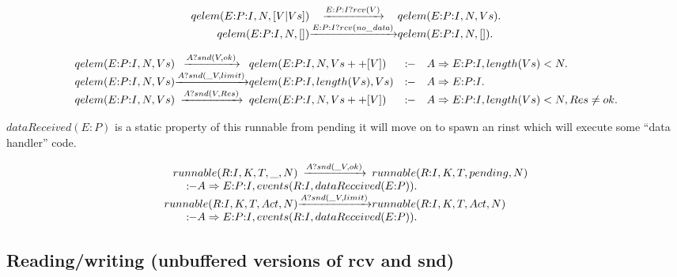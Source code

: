 \newcommand{\nodata}{\ensuremath{\mathit{no\_data}}}
\[
\begin{array}{r@{}c@{}l}
  \Preduce{qelem(E{:}P{:}I, N, [V|Vs])}{\Phear{E{:}P{:}I}{rcv(V)}}      {qelem(E{:}P{:}I, N, Vs)}    .
\\\Preduce{qelem(E{:}P{:}I, N, [])}    {\Phear{E{:}P{:}I}{rcv(\nodata)}}{qelem(E{:}P{:}I, N, [])}    .
\end{array}
\]


\[
\begin{array}{r@{}c@{}lcl}
  \Preduce{qelem(E{:}P{:}I, N, Vs)}{\Phear{A}{snd(V,ok)}}{qelem(E{:}P{:}I, N, Vs++[V])}
    &\Pif &   A\Rightarrow{}E{:}P{:}I, length(Vs) < N.
\\\Preduce{qelem(E{:}P{:}I, N, Vs)}{\Phear{A}{snd(\_V,limit)}}{qelem(E{:}P{:}I, length(Vs), Vs)}
    &\Pif &   A\Rightarrow{}E{:}P{:}I    .
\\\Preduce{qelem(E{:}P{:}I, N, Vs)}{\Phear{A}{snd(V,Res)}}{qelem(E{:}P{:}I, N, Vs++[V])}
    &\Pif &   A\Rightarrow{}E{:}P{:}I, length(Vs) < N, Res \neq ok    .
\end{array}
\]

\(dataReceived(E{:}P)\) is a static property of this runnable
  from pending it will move on to spawn an rinst which will execute some ``data handler'' code.

\[
\begin{array}{r@{}c@{}l}
  \Preduce{runnable(R{:}I, K, T, \_, N)} {\Phear{A}{snd(\_V,ok)}}   {runnable(R{:}I, K, T, pending, N)}
\\ \multicolumn{3}{l}{\qquad \Pif    A\Rightarrow{}E{:}P{:}I, events(R{:}I, dataReceived(E{:}P))    .}
\\\Preduce{runnable(R{:}I, K, T, Act, N)}{\Phear{A}{snd(\_V,limit)}}{runnable(R{:}I, K, T, Act, N)}
\\ \multicolumn{3}{l}{\qquad \Pif    A\Rightarrow{}E{:}P{:}I, events(R{:}I, dataReceived(E{:}P))    .}
\end{array}
\]


\subsection{Reading/writing (unbuffered versions of rcv and snd)}


